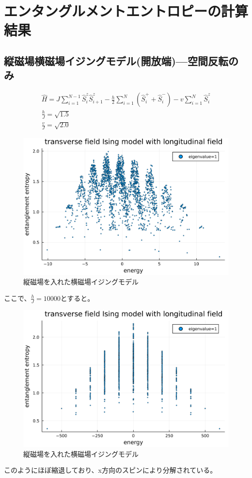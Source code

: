 \documentclass{ltjsarticle}
\begin{document}
\section{エンタングルメントエントロピーの計算結果}
\subsection*{縦磁場横磁場イジングモデル(開放端)—空間反転のみ}
\begin{gather}
  \hat{H}=J\sum_{i=1}^{N-1} \hat{S}_i^z\hat{S}_{i+1}^z - \frac{h}{2}\sum_{i=1}^{N} \left( \hat{S}_i^+ + \hat{S}_i^- \right) - v\sum_{i=1}^{N} \hat{S}_i^z\\
  \frac{h}{J}=\sqrt{1.5}\\
  \frac{v}{J}=\sqrt{2.0}
\end{gather}
\begin{figure}[H]
  \centering
  \includegraphics[width=150mm]{entropy_siteflip.png}
  \caption{縦磁場を入れた横磁場イジングモデル}
  \label{fig:entropy_siteflip}
\end{figure}
ここで、$\frac{h}{J}=10000$とすると。
\begin{figure}[H]
  \centering
  \includegraphics[width=150mm]{entropy_hjmax.png}
  \caption{縦磁場を入れた横磁場イジングモデル}
  \label{fig:entropy_hjmax}
\end{figure}
このようにほぼ縮退しており、x方向のスピンにより分解されている。\\
\end{document}

